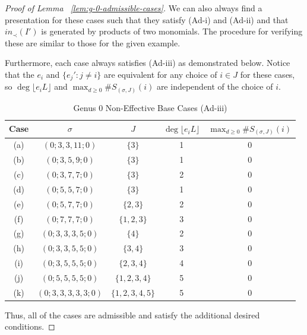 \documentclass{amsart}
\theoremstyle{plain}
\theoremstyle{definition}
\theoremstyle{remark}
\numberwithin{equation}{section}
\begin{document}
\begin{proof}[Proof of Lemma ~\ref{lem:g-0-admissible-cases}]
We can also always find a presentation for these cases such that
they satisfy (Ad-i) and (Ad-ii) and that $in_\prec(I')$ is
generated by products of two monomials. The procedure for
verifying these are similar to those for the given example.

Furthermore, each case always satisfies (Ad-iii) as demonstrated below.
Notice that the $e_i$ and $\{e_j' : j \neq i\}$ are equivalent
for any choice of $i \in J$ for these cases, so $\deg \lfloor e_i L
\rfloor$ and $\max_{d \geq 0} \#S_{(\sigma, J)}(i)$ are
independent of the choice of $i$.

\begin{longtable}
	{| c | c | c || c | c |}
	\caption{Genus 0 Non-Effective Base Cases (Ad-iii)}
	\label{table:g-0-base-cases-admissibility}
	
	\tabularnewline
	
	\hline
	Case & $\sigma$ & $J$ & $\deg \lfloor e_i L \rfloor$ &
	$\max_{d \geq 0} \#S_{(\sigma, J)}(i)$ \\
	\hline
	\hline

	(a) & $(0; 3, 3, 11; 0)$ & $\{3\}$ & 1 & 0 \\	\hline
	
	(b) & $(0; 3, 5, 9; 0)$ & $\{3\}$ & 1 & 0 \\ \hline
	
	(c) & $(0; 3, 7, 7; 0)$ & $\{3\}$ & 2 & 0 \\ \hline
	
	(d) & $(0; 5, 5, 7; 0)$ & $\{3\}$ & 1 & 0 \\ \hline
	
	(e) & $(0; 5, 7, 7; 0)$ & $\{2, 3\}$ & 2 & 0 \\ \hline

	(f) & $(0; 7, 7, 7; 0)$ & $\{1, 2, 3\}$ & 3 & 0 \\ \hline

	(g) & $(0; 3, 3, 3, 5; 0)$ & $\{4\}$ & 2 & 0 \\ \hline
	
	(h) & $(0; 3, 3, 5, 5; 0)$ & $\{3, 4\}$ & 3 & 0 \\ \hline
	
	(i) & $(0; 3, 5, 5, 5; 0)$ & $\{2, 3, 4\}$ & 4 & 0 \\ \hline
	
	(j) & $(0; 5, 5, 5, 5; 0)$ & $\{1, 2, 3, 4\}$ & 5 & 0 \\ \hline

	(k) & $(0; 3, 3, 3, 3, 3; 0)$ & $\{1, 2, 3, 4, 5\}$ & 5 & 0 \\ \hline
\end{longtable}

Thus, all of the cases are admissible and satisfy the additional
desired conditions.
\end{proof}
\end{document}
